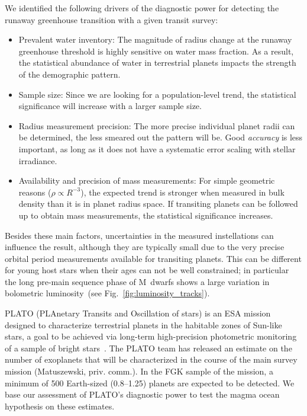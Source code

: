 \documentclass[modern]{aastex631}
\begin{document}
We identified the following drivers of the diagnostic power for detecting the runaway greenhouse transition with a given transit survey:
\begin{itemize}
    \item Prevalent water inventory: The magnitude of radius change at the runaway greenhouse threshold is highly sensitive on water mass fraction. As a result, the statistical abundance of water in terrestrial planets impacts the strength of the demographic pattern.
    \item Sample size: Since we are looking for a population-level trend, the statistical significance will increase with a larger sample size.
    \item Radius measurement precision: The more precise individual planet radii can be determined, the less smeared out the pattern will be. Good \textit{accuracy} is less important, as long as it does not have a systematic error scaling with stellar irradiance.
    \item Availability and precision of mass measurements: For simple geometric reasons ($\rho \propto R^{-3}$), the expected trend is stronger when measured in bulk density than it is in planet radius space. If transiting planets can be followed up to obtain mass measurements, the statistical significance increases.
\end{itemize}
Besides these main factors, uncertainties in the measured instellations can influence the result, although they are typically small due to the very precise orbital period measurements available for transiting planets.
This can be different for young host stars when their ages can not be well constrained; in particular the long pre-main sequence phase of M~dwarfs shows a large variation in bolometric luminosity~(see Fig.~\ref{fig:luminosity_tracks}).



PLATO (PLAnetary Transits and Oscillation of stars) is an ESA mission designed to characterize terrestrial planets in the habitable zones of Sun-like stars, a goal to be achieved via long-term high-precision photometric monitoring of a sample of bright stars~\citep{Rauer2016}.
The PLATO team has released an estimate on the number of exoplanets that will be characterized in the course of the main survey mission (Matuszewski, priv. comm.).
In the FGK sample of the mission, a minimum of 500 Earth-sized (\SIrange{0.8}{1.25}{\rEarth}) planets are expected to be detected.
We base our assessment of PLATO's diagnostic power to test the magma ocean hypothesis on these estimates.
\end{document}

